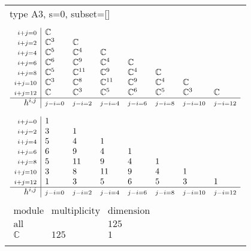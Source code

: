 \documentclass[crop,border=2mm]{standalone}
\begin{document}
\begin{tabular}{l}
{\huge type A3, s=0, subset=[]}\\ \\


$\displaystyle
\begin{array}{r|l l l l l l l}
	{\scriptstyle i+j=0}&\mathbb{C}&&&&&&\\
	{\scriptstyle i+j=2}&\mathbb{C}^{3}&\mathbb{C}&&&&&\\
	{\scriptstyle i+j=4}&\mathbb{C}^{5}&\mathbb{C}^{4}&\mathbb{C}&&&&\\
	{\scriptstyle i+j=6}&\mathbb{C}^{6}&\mathbb{C}^{9}&\mathbb{C}^{4}&\mathbb{C}&&&\\
	{\scriptstyle i+j=8}&\mathbb{C}^{5}&\mathbb{C}^{11}&\mathbb{C}^{9}&\mathbb{C}^{4}&\mathbb{C}&&\\
	{\scriptstyle i+j=10}&\mathbb{C}^{3}&\mathbb{C}^{8}&\mathbb{C}^{11}&\mathbb{C}^{9}&\mathbb{C}^{4}&\mathbb{C}&\\
	{\scriptstyle i+j=12}&\mathbb{C}&\mathbb{C}^{3}&\mathbb{C}^{5}&\mathbb{C}^{6}&\mathbb{C}^{5}&\mathbb{C}^{3}&\mathbb{C}\\
	\hline h^{i,j}&{\scriptstyle j-i=0}&{\scriptstyle j-i=2}&{\scriptstyle j-i=4}&{\scriptstyle j-i=6}&{\scriptstyle j-i=8}&{\scriptstyle j-i=10}&{\scriptstyle j-i=12}
\end{array}
$ \\ \\


$\displaystyle
\begin{array}{r|l l l l l l l}
	{\scriptstyle i+j=0}&1&&&&&&\\
	{\scriptstyle i+j=2}&3&1&&&&&\\
	{\scriptstyle i+j=4}&5&4&1&&&&\\
	{\scriptstyle i+j=6}&6&9&4&1&&&\\
	{\scriptstyle i+j=8}&5&11&9&4&1&&\\
	{\scriptstyle i+j=10}&3&8&11&9&4&1&\\
	{\scriptstyle i+j=12}&1&3&5&6&5&3&1\\
	\hline h^{i,j}&{\scriptstyle j-i=0}&{\scriptstyle j-i=2}&{\scriptstyle j-i=4}&{\scriptstyle j-i=6}&{\scriptstyle j-i=8}&{\scriptstyle j-i=10}&{\scriptstyle j-i=12}
\end{array}
$ \\ \\


$\displaystyle
\begin{array}{rll}
	\text{module}&\text{multiplicity}&\text{dimension} \\ \hline \text{all}&&125 \\
	\mathbb{C}&125&1
\end{array}
$ \\ \\

\end{tabular}
\end{document}
